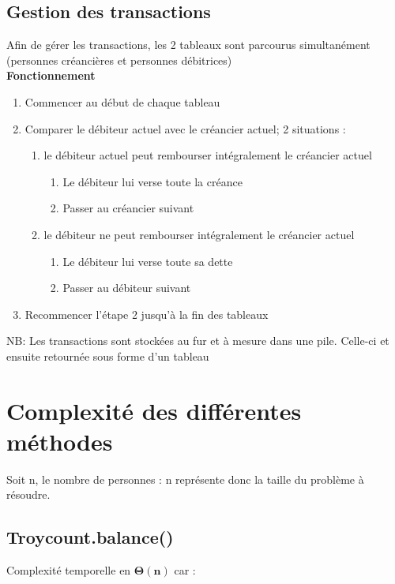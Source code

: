 \documentclass[12pt, a4paper, table]{article}
\begin{document}
\subsection{Gestion des transactions}
\noindent Afin de gérer les transactions, les 2 tableaux sont parcourus simultanément (personnes créancières et personnes débitrices) 
\smallskip \\
\noindent \textbf{Fonctionnement}

\begin{enumerate}
\item Commencer au début de chaque tableau
\item Comparer le débiteur actuel avec le créancier actuel; 2 situations :
\begin{enumerate}
\item le débiteur actuel peut rembourser intégralement le créancier actuel
\begin{enumerate}
\item Le débiteur lui verse toute la créance
\item Passer au créancier suivant 
\end{enumerate} 
\item le débiteur ne peut rembourser intégralement le créancier actuel
\begin{enumerate}
\item Le débiteur lui verse toute sa dette
\item Passer au débiteur suivant 
\end{enumerate} 
\end{enumerate}
\item Recommencer l'étape 2 jusqu'à la fin des tableaux
\end{enumerate}
 \footnotesize{NB: Les transactions sont stockées au fur et à mesure dans une pile. Celle-ci et ensuite retournée sous forme d'un tableau }








\vspace{-6pt}
\section{Complexité des différentes méthodes}
\normalsize
\noindent Soit n, le nombre de personnes : n représente donc la taille du problème à résoudre.
\vspace{-6pt}
\subsection{Troycount.balance()}
\noindent Complexité temporelle en $\mathbf{\Theta (n)}$ car :
\end{document}
